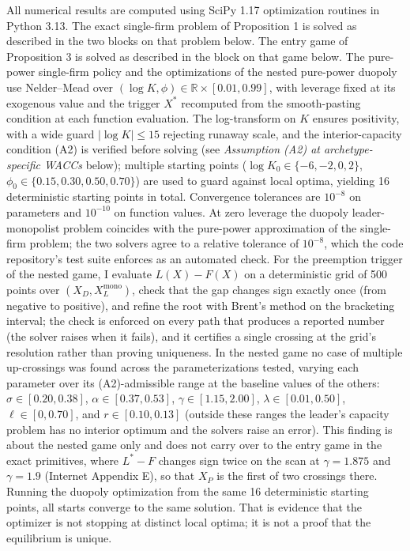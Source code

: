 \documentclass[
  11pt,
  letterpaper,
]{scrartcl}
\begin{document}
All numerical results are computed using SciPy 1.17 optimization
routines in Python 3.13. The exact single-firm problem of Proposition 1
is solved as described in the two blocks on that problem below. The
entry game of Proposition 3 is solved as described in the block on that
game below. The pure-power single-firm policy and the optimizations of
the nested pure-power duopoly use Nelder--Mead over
\((\log K, \phi) \in \mathbb{R} \times [0.01, 0.99]\), with leverage
fixed at its exogenous value and the trigger \(X^*\) recomputed from the
smooth-pasting condition at each function evaluation. The log-transform
on \(K\) ensures positivity, with a wide guard \(|\log K| \leq 15\)
rejecting runaway scale, and the interior-capacity condition (A2) is
verified before solving (see \emph{Assumption (A2) at archetype-specific
WACCs} below); multiple starting points
(\(\log K_0 \in \{-6, -2, 0, 2\}\),
\(\phi_0 \in \{0.15, 0.30, 0.50, 0.70\}\)) are used to guard against
local optima, yielding 16 deterministic starting points in total.
Convergence tolerances are \(10^{-8}\) on parameters and \(10^{-10}\) on
function values. At zero leverage the duopoly leader-monopolist problem
coincides with the pure-power approximation of the single-firm problem;
the two solvers agree to a relative tolerance of \(10^{-8}\), which the
code repository's test suite enforces as an automated check. For the
preemption trigger of the nested game, I evaluate \(L(X) - F(X)\) on a
deterministic grid of 500 points over \((X_D, X_L^{\text{mono}})\),
check that the gap changes sign exactly once (from negative to
positive), and refine the root with Brent's method on the bracketing
interval; the check is enforced on every path that produces a reported
number (the solver raises when it fails), and it certifies a single
crossing at the grid's resolution rather than proving uniqueness. In the
nested game no case of multiple up-crossings was found across the
parameterizations tested, varying each parameter over its
(A2)-admissible range at the baseline values of the others:
\(\sigma \in [0.20, 0.38]\), \(\alpha \in [0.37, 0.53]\),
\(\gamma \in [1.15, 2.00]\), \(\lambda \in [0.01, 0.50]\),
\(\ell \in [0, 0.70]\), and \(r \in [0.10, 0.13]\) (outside these ranges
the leader's capacity problem has no interior optimum and the solvers
raise an error). This finding is about the nested game only and does not
carry over to the entry game in the exact primitives, where \(L^* - F\)
changes sign twice on the scan at \(\gamma = 1.875\) and
\(\gamma = 1.9\) (Internet Appendix E), so that \(X_P\) is the first of
two crossings there. Running the duopoly optimization from the same 16
deterministic starting points, all starts converge to the same solution.
That is evidence that the optimizer is not stopping at distinct local
optima; it is not a proof that the equilibrium is unique.
\end{document}
